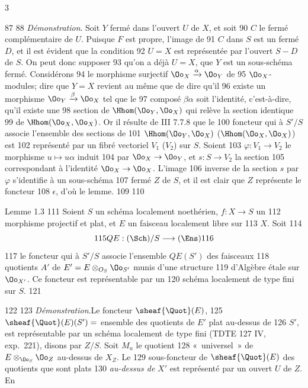 3	\documentclass[10pt]{../fichiers-configuration-latex/smfart}
\begin{document}
    87	
    88		\emph{Démonstration}. Soit $Y$ fermé dans l'ouvert $U$ de $X$, et soit
    90	$C$ le fermé complémentaire de $U$. Puisque $F$ est propre, l'image de
    91	$C$ dans $S$ est un fermé $D$, et il est évident que la condition
    92	$U=X$ est représentée par l'ouvert $S-D$ de $S$. On peut donc supposer
    93	qu'on a déjà $U=X$, \ie que $Y$ est un sous-schéma fermé. Considérons
    94	le morphisme surjectif $\Oo_{X}\xrightarrow{\alpha}\Oo_{Y}$ de
    95	$\Oo_X$-modules; dire que $Y=X$ revient au même que de dire qu'il
    96	existe un morphisme $\Oo_Y\xrightarrow{\beta}\Oo_X$ tel que le
    97	composé $\beta\alpha$ soit l'identité, c'est-à-dire, qu'il existe une
    98	section de $\Hhom(\Oo_Y,\Oo_X)$ qui relève la section identique
    99	de $\Hhom(\Oo_X,\Oo_X)$. Or il résulte de \EGA III 7.7.8 que le
   100	foncteur qui à $S'/S$ associe l'ensemble des sections de
   101	$\Hhom(\Oo_Y,\Oo_X)$ (\resp $\Hhom(\Oo_X,\Oo_X)$) est
   102	représenté par un fibré vectoriel $V_1$ (\resp $V_2$) sur $S$. Soient
   103	$\varphi:V_1\rightarrow V_2$ le morphisme $u\mapsto u\alpha$ induit
   104	par $\Oo_X\rightarrow \Oo_Y$, et $s:S\rightarrow V_2$ la section
   105	correspondant à l'identité $\Oo_X\rightarrow \Oo_X$. L'image
   106	inverse de la section $s$ par $\varphi$ s'identifie à un sous-schéma
   107	fermé $Z$ de $S$, et il est clair que $Z$ représente le foncteur
   108	$\epsilon$, d'où le lemme.
   109	
   110	\begin{enonce*}{Lemme 1.3}
   111	Soient $S$ un schéma localement noethérien, $f:X\rightarrow S$ un
   112	morphisme projectif et plat, et $E$ un faisceau localement libre sur
   113	$X$. Soit
   114	$$
   115	QE:(\Sch)/S\longrightarrow (\Ens)
   116	$$
   117	le foncteur qui à $S'/S$ associe l'ensemble $QE(S')$ des faisceaux
   118	quotients $A'$ de $E'=E\otimes_{O_S}\Oo_{S'}$ munis d'une structure
   119	d'Algèbre étale sur $\Oo_{X'}$. Ce foncteur est représentable par un
   120	schéma localement de type fini sur $S$.
   121	\end{enonce*}
   122	
   123		\emph{Démonstration}.\pageoriginale Le foncteur $\sheaf{\Quot}(E)$,
   125	$\sheaf{\Quot}(E)(S')=$ ensemble des quotients de $E'$ plat au-dessus de
   126	$S'$, est représentable par un schéma localement de type fini (TDTE
   127	IV, exp.~221), disons par $Z/S$. Soit $M_u$ le quotient
   128	« universel » de $E\otimes_{\Oo_S}\Oo_Z$ au-dessus de $X_Z$. Le
   129	sous-foncteur de $\sheaf{\Quot}(E)$ des quotients que sont plats
   130	\emph{au-dessus de} $X'$ est représenté par un ouvert $U$ de $Z$. En
\end{document}
